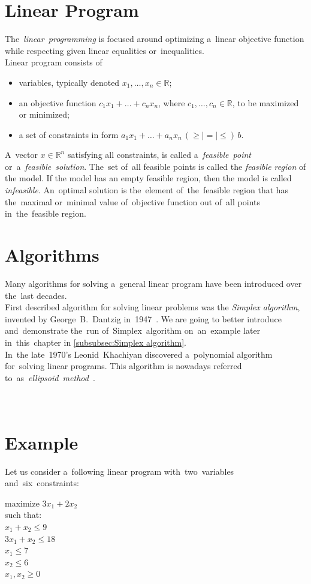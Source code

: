 \section{Linear Program}
The~\emph{linear~programming} is focused around optimizing a~linear objective function while respecting given linear equalities or~inequalities.\\
Linear program consists of
\begin{itemize}
    \item variables, typically denoted $x_1, \dots, x_n \in \mathbb{R}$;
    \item an objective function $c_1x_1 + \dots + c_nx_n$, where $c_1, \dots, c_n \in \mathbb{R}$, to be maximized or minimized;
    \item a set of constraints in form $a_1x_1 + \dots + a_nx_n\,(\geq | = | \leq)\,b$.
\end{itemize}
A~vector $x \in \mathbb{R}^n$ satisfying all constraints, is called a~\textit{feasible~point} or~a~\textit{feasible~solution}. The~set of~all feasible points is called the \textit{feasible region} of the model. If the model has an empty feasible region, then the model is called \textit{infeasible}. An~optimal solution is the~element of~the~feasible region that has the~maximal or~minimal value of~objective function out of~all points in~the~feasible region.
\section{Algorithms}
Many algorithms for solving a~general linear program have been introduced over the~last decades. \\
First described algorithm for solving linear problems was the \textit{Simplex algorithm}, invented by George~B.~Dantzig in~1947~\cite{Dantzig}. We are going to better introduce and~demonstrate the~run of~Simplex~algorithm on~an~example later in~this~chapter in \autoref{subsubsec:Simplex algorithm}.\\
In~the late~1970's Leonid~Khachiyan discovered a~polynomial algorithm for~solving linear programs. This algorithm is nowadays referred to~as~\textit{ellipsoid~method}~\cite{Khachiyan}.
\\
\\
\\
\section{Example}
Let us consider a~following linear program with~two~variables and~six~constraints:
\begin{center}
    maximize $3x_1 + 2x_2$\\
    such that: \\
    $x_1 + x_2 \leq 9$\\
    $3x_1 + x_2 \leq 18$\\
    $x_1 \leq 7$\\
    $x_2 \leq 6$\\
    $x_1,x_2 \geq 0$
\end{center}
